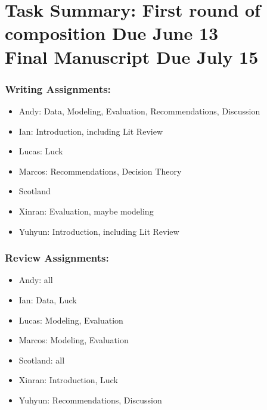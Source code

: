 \section*{Task Summary: First round of composition Due June 13\\
Final Manuscript Due July 15}

\subsubsection*{Writing Assignments:}
\begin{itemize}
\item Andy: Data, Modeling, Evaluation, Recommendations, Discussion
\item Ian: Introduction, including Lit Review
\item Lucas: Luck
\item Marcos: Recommendations, Decision Theory
\item Scotland 
\item Xinran: Evaluation, maybe modeling
\item Yuhyun: Introduction, including Lit Review
\end{itemize}

\subsubsection*{Review Assignments:}
\begin{itemize}
\item Andy: all
\item Ian: Data, Luck
\item Lucas: Modeling, Evaluation
\item Marcos: Modeling, Evaluation
\item Scotland: all
\item Xinran: Introduction, Luck
\item Yuhyun: Recommendations, Discussion
\end{itemize}

\newpage
